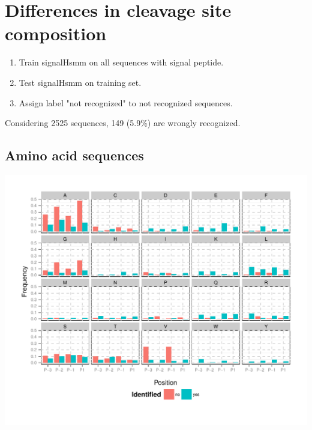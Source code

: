\documentclass[10pt]{beamer}\usepackage[]{graphicx}\usepackage[]{color}
\makeatletter
\def\maxwidth{ %
  \ifdim\Gin@nat@width>\linewidth
    \linewidth
  \else
    \Gin@nat@width
  \fi
}
\makeatother
\begin{document}
\section{Differences in cleavage site composition}

\begin{frame}
\begin{enumerate}
\item Train signalHsmm on all sequences with signal peptide.
\item Test signalHsmm on training set.
\item Assign label "not recognized" to not recognized sequences.
\end{enumerate}
\end{frame}


\begin{frame}

Considering 2525 sequences, 149 (5.9\%) are wrongly recognized.

\end{frame}

\subsection{Amino acid sequences}

\begin{frame}

\includegraphics[width=\maxwidth]{figure/unnamed-chunk-4-1} 

\end{frame}
\end{document}

